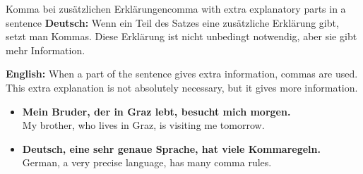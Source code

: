 \documentclass[a4paper,11pt]{article}
\newcommand{\GermanText}[1]{\textbf{Deutsch: }#1\par}
\newcommand{\EnglishText}[1]{{\small\color{SoftGray}\textbf{English: }#1\par}}
\newcommand{\ExampleItem}[2]{\item \textbf{#1}\\{\small\color{SoftGray}#2}}
\begin{document}
        \begin{grammarentry}{Komma bei zusätzlichen Erklärungen}{comma with extra explanatory parts in a sentence}
            \GermanText{Wenn ein Teil des Satzes eine zusätzliche Erklärung gibt, setzt man Kommas. Diese Erklärung ist nicht unbedingt notwendig, aber sie gibt mehr Information.}
            \EnglishText{When a part of the sentence gives extra information, commas are used. This extra explanation is not absolutely necessary, but it gives more information.}
            
            \begin{exbox}
                \begin{itemize}
                    \ExampleItem{Mein Bruder, der in Graz lebt, besucht mich morgen.}{My brother, who lives in Graz, is visiting me tomorrow.}
                    \ExampleItem{Deutsch, eine sehr genaue Sprache, hat viele Kommaregeln.}{German, a very precise language, has many comma rules.}
                \end{itemize}
            \end{exbox}
        \end{grammarentry}
\end{document}
